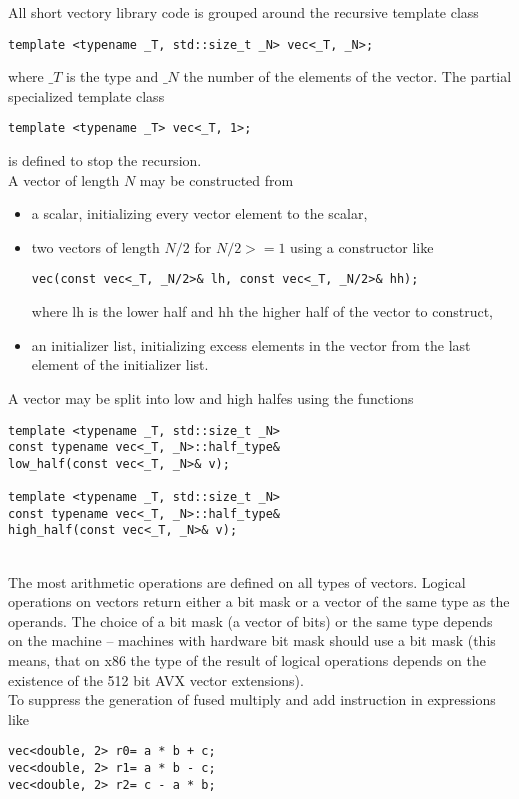 \documentclass[10pt,a4paper,final,oneside]{article}
\numberwithin{equation}{subsection}
\begin{document}
All short vectory library code is grouped around the recursive template
class
\begin{lstlisting}
template <typename _T, std::size_t _N> vec<_T, _N>;
\end{lstlisting}
where $\_T$ is the type and $\_N$ the number of the elements of the
vector. The partial specialized template class
\begin{lstlisting}
template <typename _T> vec<_T, 1>;
\end{lstlisting}
is defined to stop the recursion.\\
%
A vector of length $N$ may be constructed from
\begin{itemize}
\item a scalar, initializing every vector element to the scalar,
\item two vectors of length $N/2$ for $N/2>=1$
      using a constructor like
\begin{lstlisting}
vec(const vec<_T, _N/2>& lh, const vec<_T, _N/2>& hh);
\end{lstlisting}
      where lh is the lower half and hh the higher half of the vector to
      construct,
\item an initializer list, initializing excess elements in the
  vector from the last element of the initializer list.
\end{itemize}
A vector may be split into low and high halfes using the functions
\begin{lstlisting}
template <typename _T, std::size_t _N>
const typename vec<_T, _N>::half_type&
low_half(const vec<_T, _N>& v);

template <typename _T, std::size_t _N>
const typename vec<_T, _N>::half_type&
high_half(const vec<_T, _N>& v);
\end{lstlisting}{\ }\\[10pt]
The most arithmetic operations are defined on all types of vectors.
Logical operations on vectors return either a bit mask or a vector of
the same type as the operands. The choice of a bit mask (a vector of
bits) or the same type depends on the machine -- machines with
hardware bit mask should use a bit mask (this means, that on x86 the
type of the result of logical operations depends on the existence of
the 512 bit AVX vector extensions). \\[10pt]
%
To suppress the generation of fused multiply and add instruction
in expressions like
\begin{lstlisting}
vec<double, 2> r0= a * b + c;
vec<double, 2> r1= a * b - c;
vec<double, 2> r2= c - a * b;
\end{lstlisting}
\end{document}

